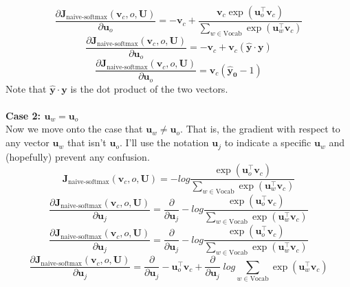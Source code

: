 \documentclass[12pt]{article}
\begin{document}
\begin{equation*}
    \frac{\partial \bm J_{\text{naive-softmax}}(\bm v_c, o, \bm U)}{\partial \bm u_o} = 
    - \bm v_c +
    \frac{\bm v_c \exp(\bm u_o^\top \bm v_c)}{\sum_{w \in \text{Vocab}} \exp(\bm u_{w}^\top \bm v_c)}
\end{equation*}
\begin{equation*}
    \frac{\partial \bm J_{\text{naive-softmax}}(\bm v_c, o, \bm U)}{\partial \bm u_o} = 
    - \bm v_c + \bm v_c (\bm {\hat y} \cdot \bm y)
\end{equation*}
\begin{equation*}
    \frac{\partial \bm J_{\text{naive-softmax}}(\bm v_c, o, \bm U)}{\partial \bm u_o} = 
    \bm v_c ( \bm {\hat y_0} - 1 )
\end{equation*}
Note that $\bm {\hat y} \cdot \bm y$ is the dot product of the two vectors. 
~\\
~\\
\textbf{Case 2: $\bm u_w = \bm u_o$}
~\\
Now we move onto the case that $\bm u_w \ne \bm u_o$. That is, the gradient with respect to 
any vector $\bm u_w$ that isn't $\bm u_o$. I'll use the notation $\bm u_j$ to indicate a 
specific $\bm u_w$ and (hopefully) prevent any confusion.
\begin{equation*}
    \bm J_{\text{naive-softmax}}(\bm v_c, o, \bm U) = 
    -log \frac{\exp(\bm u_{o}^\top \bm v_c)}{\sum_{w \in \text{Vocab}} \exp(\bm u_{w}^\top \bm v_c)}
\end{equation*}
\begin{equation*}
    \frac{\partial \bm J_{\text{naive-softmax}}(\bm v_c, o, \bm U)}{\partial \bm u_j} = 
    \frac{\partial}{\partial \bm u_j} 
    - log \frac{\exp(\bm u_{o}^\top \bm v_c)}{\sum_{w \in \text{Vocab}} \exp(\bm u_{w}^\top \bm v_c)}
\end{equation*}
\begin{equation*}
    \frac{\partial \bm J_{\text{naive-softmax}}(\bm v_c, o, \bm U)}{\partial \bm u_j} = 
    \frac{\partial}{\partial \bm u_j} 
    - log \frac{\exp(\bm u_{o}^\top \bm v_c)}{\sum_{w \in \text{Vocab}} \exp(\bm u_{w}^\top \bm v_c)}
\end{equation*}
\begin{equation*}
    \frac{\partial \bm J_{\text{naive-softmax}}(\bm v_c, o, \bm U)}{\partial \bm u_j} = 
    \frac{\partial}{\partial \bm u_j} 
    - \bm u_o^\top \bm v_c +
    \frac{\partial}{\partial \bm u_j} 
    \; log \sum_{w \in \text{Vocab}} \exp(\bm u_{w}^\top \bm v_c)
\end{equation*}
\end{document}
